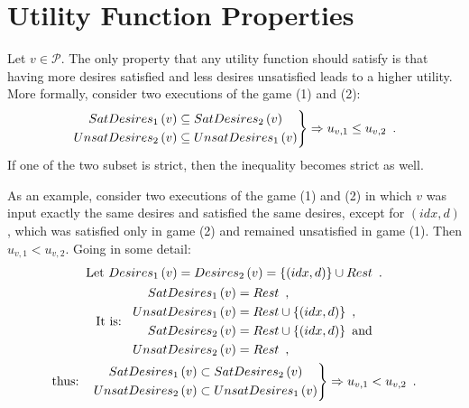 \section{Utility Function Properties}
  Let $v \in \mathcal{P}$. The only property that any utility function should satisfy is that having more desires satisfied
  and less desires unsatisfied leads to a higher utility.
  More formally, consider two executions of the game (1) and (2):
  \begin{equation*}
    \begin{rcases}
    \begin{aligned}
      SatDesires_1\left(v\right) &\subseteq SatDesires_2\left(v\right) \\
      UnsatDesires_2\left(v\right) &\subseteq UnsatDesires_1\left(v\right)
    \end{aligned}
    \end{rcases}
    \Rightarrow u_{v,1} \leq u_{v,2} \enspace.
  \end{equation*}
  If one of the two subset is strict, then the inequality becomes strict as well.

  As an example, consider two executions of the game (1) and (2) in which $v$ was input exactly the same desires and satisfied
  the same desires, except for $\left(idx, d\right)$, which was satisfied only in game (2) and remained unsatisfied in game
  (1). Then $u_{v,1} < u_{v,2}$. Going in some detail:
  \begin{gather*}
    \mbox{Let } Desires_1\left(v\right) = Desires_2\left(v\right) = \{\left(idx, d\right)\} \cup Rest \enspace. \\
    \mbox{It is: } \:\:
    \begin{aligned}
      SatDesires_1\left(v\right) &= Rest \enspace, \\
      UnsatDesires_1\left(v\right) &= Rest \cup \{\left(idx, d\right)\} \enspace, \\
      SatDesires_2\left(v\right) &= Rest \cup \{\left(idx, d\right)\} \enspace\mbox{and} \\
      UnsatDesires_2\left(v\right) &= Rest \enspace,
    \end{aligned} \\
    \mbox{thus:   } \:\: 
    \begin{rcases}
    \begin{aligned}
      SatDesires_1\left(v\right) &\subset SatDesires_2\left(v\right) \\
      UnsatDesires_2\left(v\right) &\subset UnsatDesires_1\left(v\right)
    \end{aligned}
    \end{rcases}
    \Rightarrow u_{v,1} < u_{v,2} \enspace.
  \end{gather*}
